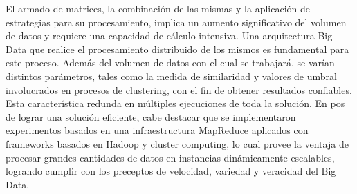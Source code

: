 \bigskip El armado de matrices, la combinación de las mismas y la aplicación de estrategias para su procesamiento, implica un aumento significativo del volumen de datos y requiere una capacidad de cálculo intensiva. Una arquitectura Big Data que realice el procesamiento distribuido de los mismos es fundamental para este proceso. Además del volumen de datos con el cual se trabajará, se varían distintos parámetros, tales como la medida de similaridad y valores de umbral involucrados en procesos de clustering, con el fin de obtener resultados confiables. Esta característica redunda en múltiples ejecuciones de toda la solución. En pos de lograr una solución eficiente, cabe destacar que se implementaron experimentos basados en una infraestructura MapReduce aplicados con frameworks basados en Hadoop y cluster computing, lo cual provee la ventaja de procesar grandes cantidades de datos en instancias dinámicamente escalables, logrando cumplir con los preceptos de velocidad, variedad y veracidad del Big Data.